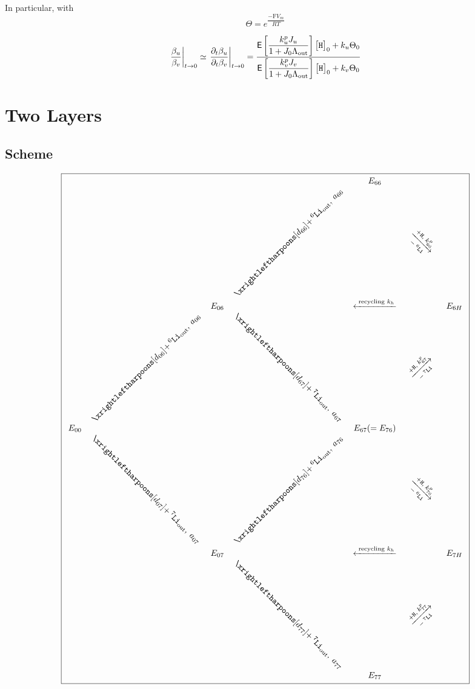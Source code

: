 \documentclass[aps,onecolumn,11pt]{revtex4}
\newcommand{\mychem}[1]{\mathtt{#1}}
\newcommand{\myconc}[1]{\big[#1\big]}
\newcommand{\Faraday}{\mathrm{F}}
\newcommand{\spLi}[1]{{\!~^{#1}\mychem{Li}}}
\newcommand{\spproton}{\mychem{H}}
\newcommand{\proton}{\myconc{\spproton}}
\newcommand{\myout}[1]{{#1}_{\tiny\mathrm{out}}}
\newcommand{\spLiOut}[1]{\myout{\spLi{#1}}}
\newcommand{\myrotate}[2]{\rotatebox[origin=c]{#1}{#2}}
\newcommand{\LiAll}{\Lambda}
\newcommand{\LiAllOut}{\myout{\LiAll}}
\begin{document}
In particular, with
\begin{equation}
	\Theta = e^{\dfrac{-\Faraday V_m }{RT}}
\end{equation}

\begin{equation}
	\left.\dfrac{\beta_u}{\beta_v}\right\vert_{t\to0} \simeq \left.\dfrac{\partial_t \beta_u}{\partial_t\beta_v}\right\vert_{t\to0}
	= \dfrac{\mathsf{E} \left[\dfrac{k^p_u J_u}{1+J_0 \LiAllOut}\right] \proton_0 + k_u  \Theta_0
	}
	{
	\mathsf{E} \left[\dfrac{k^p_v J_v}{1+J_0 \LiAllOut}\right] \proton_0 + k_v  \Theta_0
	}
\end{equation}


\section{Two Layers}
\subsection{Scheme}
{
\Large
\begin{equation}
\boxed{
\begin{array}{ccccccc}
 & &        &                                                  & E_{66} & & \\
 & &        & \myrotate{45}{$\xrightleftharpoons[d_{66}]{+\spLiOut{6},\;a_{66}}$} & &  \myrotate{-45}{$\xrightarrow[-\spLi{6}]{+ \spproton, \; k^p_{66}}$}& \\
 & & E_{06} &  & \xleftarrow{\text{ recycling } k_h } & & E_{6H}\\
 &  \myrotate{45}{$\xrightleftharpoons[d_{06}]{+\spLiOut{6},\;a_{06}}$} &   & \myrotate{-45}{$\xrightleftharpoons[d_{67}]{+\spLiOut{7},\;a_{67}}$} & & \myrotate{45}{$\xrightarrow[-\spLi{7}]{+ \spproton, \; k^p_{67}}$}&\\
E_{00} & &  & & E_{67}(=E_{76}) & & \\ 
  & \myrotate{-45}{$\xrightleftharpoons[d_{07}]{+\spLiOut{7},\;a_{07}}$} &  & \myrotate{45}{$\xrightleftharpoons[d_{76}]{+\spLiOut{6},\;a_{76}}$} & & \myrotate{-45}{$\xrightarrow[-\spLi{6}]{+ \spproton, \; k^p_{76}}$} & \\
  & & E_{07} &   & \xleftarrow{\text{ recycling } k_h } & & E_{7H}\\
  & &  & \myrotate{-45}{$\xrightleftharpoons[d_{77}]{+\spLiOut{7},\;a_{77}}$} & & \myrotate{45}{$\xrightarrow[-\spLi{7}]{+ \spproton, \; k^p_{77}}$} &\\
  & &  &  & E_{77} & &\\

 \end{array}
 }
\end{equation}
}
\end{document}
